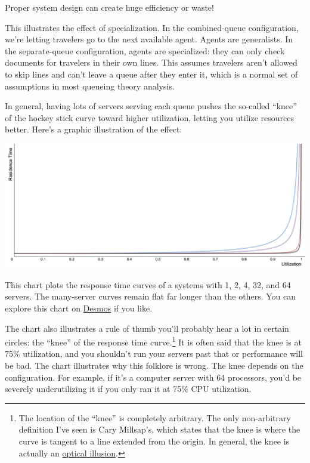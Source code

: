 \documentclass{vivid_layout_pdf}
\begin{document}
Proper system design can create huge efficiency or waste!

This illustrates the effect of specialization. In the combined-queue configuration, we're letting travelers go to the next available agent. Agents are generalists. In the separate-queue configuration, agents are specialized: they can only check documents for travelers in their own lines. This assumes travelers aren't allowed to skip lines and can't leave a queue after they enter it, which is a normal set of assumptions in most queueing theory analysis.

In general, having lots of servers serving each queue pushes the so-called ``knee'' of the hockey stick curve toward higher utilization, letting you utilize resources better. Here's a graphic illustration of the effect:

\begin{center}
\includegraphics[width=.75\linewidth]{queueing-theory/multi-q}
\end{center}

This chart plots the response time curves of a systems with 1, 2, 4, 32, and 64 servers. The many-server curves remain flat far longer than the others. You can explore this chart on \href{https://www.desmos.com/calculator/iwaj9vujiu}{Desmos} if you like.

The chart also illustrates a rule of thumb you'll probably hear a lot in certain circles: the ``knee'' of the response time curve.\footnote{The location of the ``knee'' is completely arbitrary. The only non-arbitrary definition I've seen is Cary Millsap's, which states that the knee is where the curve is tangent to a line extended from the origin. In general, the knee is actually an \href{http://perfdynamics.blogspot.com/2008/03/watching-your-knees-and-queues.html}{optical illusion}.} It is often said that the knee is at 75\% utilization, and you shouldn't run your servers past that or performance will be bad. The chart illustrates why this folklore is wrong. The knee depends on the configuration. For example, if it's a computer server with 64 processors, you'd be severely underutilizing it if you only ran it at 75\% CPU utilization.
\end{document}

